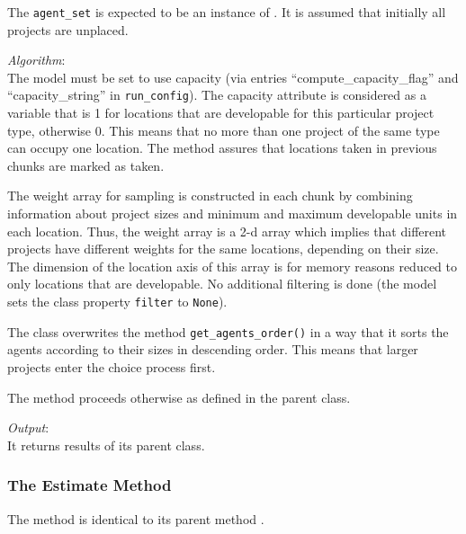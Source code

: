 The \verb|agent_set| is expected to be an instance of
. It is assumed that initially all projects are
unplaced.

{\it Algorithm}:\\[1mm]
The model must be set to use capacity (via entries ``compute_capacity_flag''
and ``capacity_string'' in \verb|run_config|).  The capacity attribute is
considered as a variable that is 1 for locations that are developable for this
particular project type, otherwise 0. This means that no more than one project
of the same type can occupy one location. The method
 assures that locations taken in previous
chunks are marked as taken.

The weight array for sampling is constructed in each chunk by combining
information about project sizes and minimum and maximum developable units in
each location.  Thus, the weight array is a 2-d array which implies that
different projects have different weights for the same locations, depending on
their size. The dimension of the location axis of this array is for memory
reasons reduced to only locations that are developable. No additional
filtering is done (the model sets the class property \verb|filter| to
\verb|None|).

The class overwrites the method \verb|get_agents_order()| in a way that it
sorts the agents according to their sizes in descending order. This means that
larger projects enter the choice process first.

The  method proceeds otherwise as defined in the parent class.

{\it Output}:~\\[1mm]
It returns results of its parent class.

\subsubsection{The Estimate Method}
%
The  method is identical to its parent method
.


